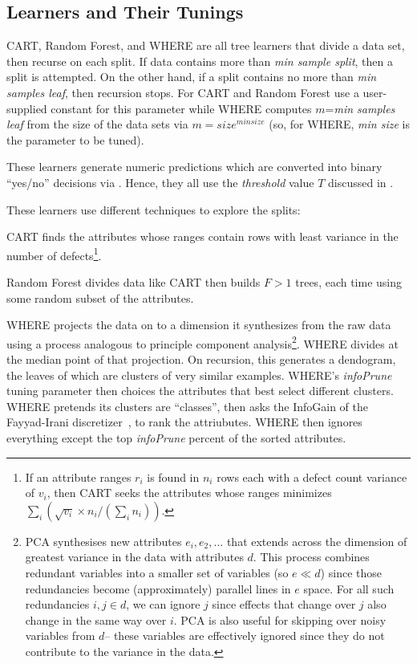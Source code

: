 \subsection{Learners and Their Tunings}

CART, Random Forest, and WHERE are all  tree learners that divide a data set, then recurse
on each split.
If data contains more than {\em min sample split}, then a split is attempted.
On the other hand, if a split contains no more than {\em min samples leaf}, then recursion stops. For CART and Random Forest use a 
user-supplied constant for this parameter while
WHERE computes $m$={\em min samples leaf} from the size of the data
sets via  $m=\mathit{size}^\mathit{min size}$ (so, for WHERE,
{\em min size} is the parameter to be tuned).

These learners
generate numeric predictions which are converted
into binary ``yes/no'' decisions via . Hence, they all use the {\em threshold} value $T$ discussed in .

These learners use different techniques to explore the splits:
\bi
\item
CART finds the attributes whose ranges contain rows with least variance in the number
of defects\footnote{If an attribute ranges $r_i$ is found in 
$n_i$ rows each with a  defect count variance of $v_i$, then CART seeks the attributes
whose ranges minimizes $\sum_i \left(\sqrt{v_i}\times n_i/(\sum_i n_i)\right)$.}.
\item
Random Forest    divides data like CART then  builds $F>1$  trees,
each time using some random subset of
the attributes. 
\item
WHERE projects the data on to a dimension it synthesizes from the raw data using
a process analogous to principle component analysis\footnote{
PCA  synthesises  new
attributes $e_i, e_2,...$
that extends across the dimension of greatest  variance in the data  with attributes $d$.  
This process  combines
redundant  variables into a smaller set of variables  (so $e \ll d$) since those
redundancies become (approximately) parallel lines
in $e$ space. For all such redundancies \mbox{$i,j \in d$}, we 
can ignore $j$ 
since effects that change over $j$ also
change in the same way over $i$.
PCA is also useful for skipping over noisy variables from $d$-- these
variables are effectively ignored since    they  do not contribute to the variance in the data.}.
WHERE   divides  at the median point of that projection. On recursion,
this generates a dendogram, the leaves of which are clusters of  very similar examples.
\ei
WHERE's {\em infoPrune} tuning parameter then choices the
attributes   that best select  different clusters.
WHERE pretends its clusters are ``classes'', then 
asks the InfoGain of the
Fayyad-Irani discretizer~\cite{FayIra93Multi}, to rank the attriubutes.
WHERE then ignores everything except the top   {\em infoPrune} percent of the sorted
attributes.

